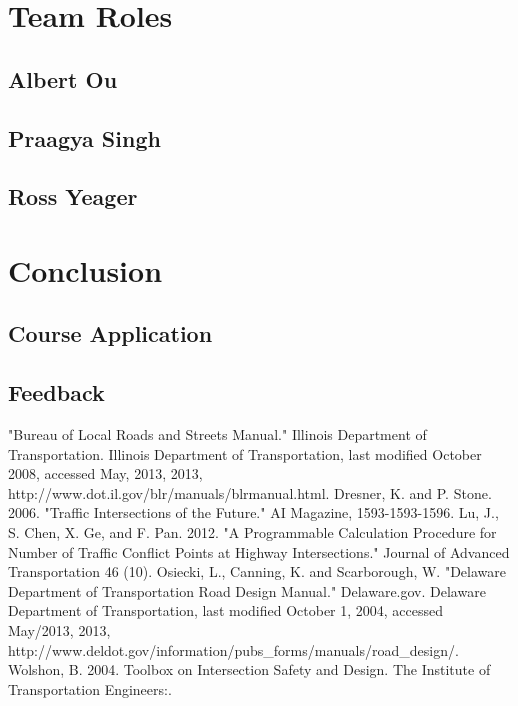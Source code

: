 \documentclass[10pt]{article}
\begin{document}
\section{Team Roles}

\subsection{Albert Ou}

\subsection{Praagya Singh}

\subsection{Ross Yeager}

\section{Conclusion}

\subsection{Course Application}

\subsection{Feedback}

\begin{thebibliography}{100}
 "Bureau of Local Roads and Streets Manual." Illinois Department of Transportation. Illinois Department of Transportation, last modified October 2008, accessed May, 2013, 2013, http://www.dot.il.gov/blr/manuals/blrmanual.html.
 Dresner, K. and P. Stone. 2006. "Traffic Intersections of the Future." AI Magazine, 1593-1593-1596.
 Lu, J., S. Chen, X. Ge, and F. Pan. 2012. "A Programmable Calculation Procedure for Number of Traffic Conflict Points at Highway Intersections." Journal of Advanced Transportation 46 (10).
 Osiecki, L., Canning, K. and Scarborough, W. "Delaware Department of Transportation Road Design Manual." Delaware.gov. Delaware Department of Transportation, last modified October 1, 2004, accessed May/2013, 2013, http://www.deldot.gov/information/pubs_forms/manuals/road_design/.
 Wolshon, B. 2004. Toolbox on Intersection Safety and Design. The Institute of Transportation Engineers:.
\end{thebibliography}
\end{document}
